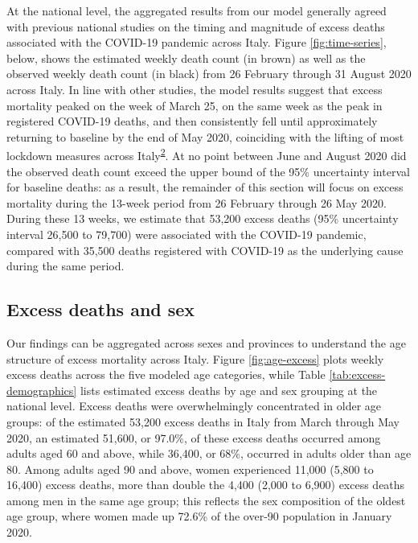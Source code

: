 \documentclass[
]{article}
\begin{document}
At the national level, the aggregated results from our model generally agreed with previous national studies on the timing and magnitude of excess deaths associated with the COVID-19 pandemic across Italy. Figure \ref{fig:time-series}, below, shows the estimated weekly death count (in brown) as well as the observed weekly death count (in black) from 26 February through 31 August 2020 across Italy. In line with other studies, the model results suggest that excess mortality peaked on the week of March 25, on the same week as the peak in registered COVID-19 deaths, and then consistently fell until approximately returning to baseline by the end of May 2020, coinciding with the lifting of most lockdown measures across Italy\textsuperscript{\protect\hyperlink{ref-Alicandro2020}{2}}⁠. At no point between June and August 2020 did the observed death count exceed the upper bound of the 95\% uncertainty interval for baseline deaths: as a result, the remainder of this section will focus on excess mortality during the 13-week period from 26 February through 26 May 2020. During these 13 weeks, we estimate that 53,200 excess deaths (95\% uncertainty interval 26,500 to 79,700) were associated with the COVID-19 pandemic, compared with 35,500 deaths registered with COVID-19 as the underlying cause during the same period.

\hypertarget{excess-deaths-and-sex}{%
\subsection{Excess deaths and sex}\label{excess-deaths-and-sex}}

Our findings can be aggregated across sexes and provinces to understand the age structure of excess mortality across Italy. Figure \ref{fig:age-excess} plots weekly excess deaths across the five modeled age categories, while Table \ref{tab:excess-demographics} lists estimated excess deaths by age and sex grouping at the national level. Excess deaths were overwhelmingly concentrated in older age groups: of the estimated 53,200 excess deaths in Italy from March through May 2020, an estimated 51,600, or 97.0\%, of these excess deaths occurred among adults aged 60 and above, while 36,400, or 68\%, occurred in adults older than age 80. Among adults aged 90 and above, women experienced 11,000 (5,800 to 16,400) excess deaths, more than double the 4,400 (2,000 to 6,900) excess deaths among men in the same age group; this reflects the sex composition of the oldest age group, where women made up 72.6\% of the over-90 population in January 2020.
\end{document}
